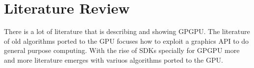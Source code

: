 \chapter{Literature Review}\label{ch:literature_review}






There is a lot of literature that is describing and showing \gls{GPGPU}. The literature
of old algorithms ported to the \gls{GPU} focuses how to exploit a graphics
\gls{API} to do general purpose computing. With the rise of \glspl{SDK}
specially for \gls{GPGPU} more and more literature emerges with variuos 
algorithms ported to the \gls{GPU}. 


